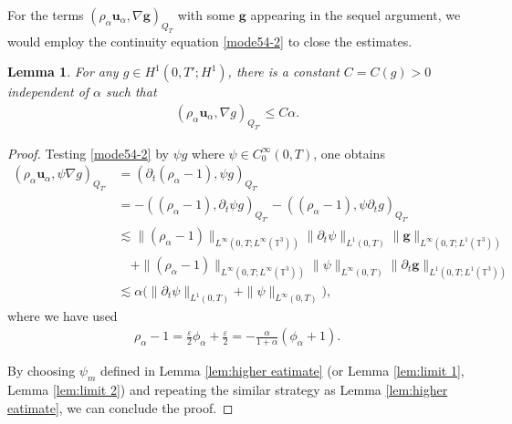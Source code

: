 \documentclass[reqno,a4paper,11pt]{amsart}
\theoremstyle{plain}
\newtheorem{lemma}[theorem]{Lemma}
\numberwithin{equation}{section}
\newcommand{\bg}{\mathbf{g}}
\renewcommand{\d}{\mathrm{d}}
\newcommand{\dx}{\d x}
\newcommand{\dtau}{\,\d\tau}
\begin{document}
					
					For the terms $(\rho_{\alpha}\mathbf{u}_{\alpha},\nabla\bg)_{Q_{T}}$ with some $ \bg $ appearing in the sequel argument, we would employ the continuity equation \eqref{mode54-2} to close the estimates.
					\begin{lemma}\label{lem:limit 3}
						For any  $g\in H^{1}(0,T';H^{1})$, there is a constant $C=C(g) > 0$ independent of $\alpha$ such that
						\begin{align}
							(\rho_{\alpha}\mathbf{u}_{\alpha},\nabla g)_{Q_{T'}}\leq C\alpha.\label{new velocity est-00}
						\end{align}
					\end{lemma}
					\begin{proof}
						Testing \eqref{mode54-2} by $\psi g$ where $\psi\in C_{0}^{\infty}(0,T)$, one obtains
						\begin{align}\label{lem:limit31}
							(\rho_{\alpha}\mathbf{u}_{\alpha},\psi\nabla g)_{Q_{T'}}&=(\partial_{t}(\rho_{\alpha}-1),\psi g)_{Q_{T'}}
							\nonumber\\&=-((\rho_{\alpha}-1),\partial_{t}\psi g)_{Q_{T'}}-((\rho_{\alpha}-1),\psi\partial_{t}g)_{Q_{T'}} \nonumber\\&\lesssim \|(\rho_{\alpha}-1)\|_{L^{\infty}(0,T;L^{\infty}(\mathbb{T}^{3}))}\|\partial_{t}\psi\|_{L^{1}(0,T)}\|\bg\|_{L^{\infty}(0,T;L^{1}(\mathbb{T}^{3}))}
							\nonumber\\&\quad+\|(\rho_{\alpha}-1)\|_{L^{\infty}(0,T;L^{\infty}(\mathbb{T}^{3}))}\|\psi\|_{L^{\infty}(0,T)}\|\partial_{t}\bg\|_{L^{1}(0,T;L^{1}(\mathbb{T}^{3}))}
							\nonumber\\&\lesssim \alpha\big(\|\partial_{t}\psi\|_{L^{1}(0,T)}+\|\psi\|_{L^{\infty}(0,T)}\big),
						\end{align}
						where we have used
						\begin{align*}
							\rho_{\alpha}-1=\frac{\varepsilon}{2}\phi_{\alpha}+\frac{\varepsilon}{2}=-\frac{\alpha}{1+\alpha}(\phi_{\alpha}+1).
						\end{align*}
						
						
						By choosing $\psi_m$ defined in Lemma \ref{lem:higher eatimate} (or Lemma \ref{lem:limit 1}, Lemma \ref{lem:limit 2}) and repeating the similar strategy as Lemma \ref{lem:higher eatimate}, we can conclude the proof.
					\end{proof}
					
\end{document}
